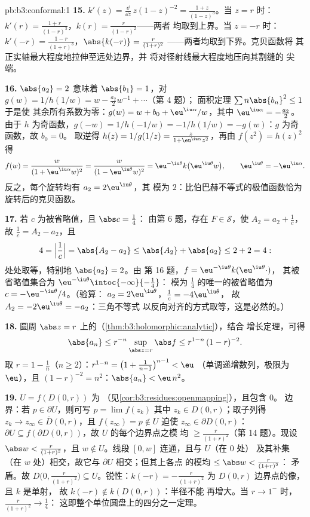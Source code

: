 \begin{solution}{pb:b3:conformal:1}
\textbf{15.} $k'(z) = \frac{\dd}{\dd z}\,z(1 - z)^{-2} =
\frac{1 + z}{(1 - z)^3}$。当 $z = r$ 时：$k'(r) =
\frac{1+r}{(1-r)^3}$，$k(r) = \frac r{(1-r)^2}$——两者
均取到上界。当 $z = -r$ 时：$k'(-r) =
\frac{1-r}{(1+r)^3}$，$\abs{k(-r)} = \frac r{(1+r)^2}$
——两者均取到下界。克贝函数将
其正实轴最大程度地拉伸至远处边界，并
将对径射线最大程度地压向其割缝的
尖端。

\textbf{16.} $\abs{a_2} = 2$ 意味着 $\abs{b_1} = 1$，对 $g(w)
= 1/h(1/w) = w - \frac{a_2}2w^{-1} + \cdots$（第 4 题）；
面积定理 $\sum n\abs{b_n}^2 \leq 1$ 于是使
其余所有系数为零：$g(w) = w + b_0 + \eu^{\iu\alpha}/w$，其中
$\eu^{\iu\alpha} = -\frac{a_2}2$。由于 $h$ 为奇函数，$g(-w) =
1/h(-1/w) = -1/h(1/w) = -g(w)$：$g$ 为奇函数，故 $b_0 = 0$。
取逆得 $h(z) = 1/g(1/z) = \frac{z}{1 +
\eu^{\iu\alpha}z^2}$，再由 $f(z^2) = h(z)^2$ 得
\[
f(w) = \frac{w}{(1 + \eu^{\iu\alpha}w)^2}
= \frac{w}{(1 - \eu^{\iu\theta}w)^2}
= \eu^{-\iu\theta}k\bigl(\eu^{\iu\theta}w\bigr),
\qquad \eu^{\iu\theta} = -\eu^{\iu\alpha} .
\]
反之，每个旋转均有 $a_2 = 2\eu^{\iu\theta}$，其
模为 $2$：比伯巴赫不等式的极值函数恰为
旋转后的克贝函数。

\textbf{17.} 若 $c$ 为被省略值，且 $\abs c = \frac14$：
由第 6 题，存在 $F \in \mathcal S$，使 $A_2 = a_2 +
\frac1c$，故 $\frac1c = A_2 - a_2$，且
\[
4 = \Bigl|\frac1c\Bigr| = \abs{A_2 - a_2}
\leq \abs{A_2} + \abs{a_2} \leq 2 + 2 = 4 :
\]
处处取等，特别地 $\abs{a_2} = 2$。由
第 16 题，$f = \eu^{-\iu\theta}k(\eu^{\iu\theta}\cdot)$，
其被省略值集合为 $\eu^{-\iu\theta}
\intoc{-\infty}{-\frac14}$：
模为 $\frac14$ 的唯一的被省略值为 $c = -\eu^{-\iu\theta}/4$。（验算：
$a_2 = 2\eu^{\iu\theta}$，$\frac1c = -4\eu^{\iu\theta}$，
故 $A_2 = -2\eu^{\iu\theta} = -a_2$：三角不等式
以反向对齐的方式取等，这是必然的。）

\textbf{18.} 圆周 $\abs z =
r$ 上的（\cref{thm:b3:holomorphic:analytic}），结合
增长定理，可得
\[
\abs{a_n} \leq r^{-n}\sup_{\abs z = r}\abs f
\leq r^{1-n}\,(1 - r)^{-2} .
\] 取 $r = 1 - \frac1n$（$n \geq
2$）：$r^{1-n} = \bigl(1 + \frac1{n-1}\bigr)^{n-1} < \eu$
（单调递增数列，极限为 $\eu$），且 $(1 - r)^{-2} =
n^2$：$\abs{a_n} < \eu\,n^2$。

\textbf{19.} $U = f(D(0, r))$ 为
（见\cref{cor:b3:residues:openmapping}），且包含 $0$。
边界：若 $p \in \partial U$，则可写 $p = \lim f(z_k)$
其中 $z_k \in D(0, r)$；取子列得 $z_k \to z_\infty
\in \bar D(0, r)$，且 $f(z_\infty) = p \notin U$ 迫使
$z_\infty \in \partial D(0, r)$：$\partial U \subseteq
f(\partial D(0, r))$，故 $U$ 的每个边界点之模
均 $\geq \frac r{(1+r)^2}$（第 14 题）。现设
$\abs w < \frac r{(1+r)^2}$，且 $w \notin U$。线段
$[0, w]$ 连通，且与 $U$（在 $0$ 处）
及其补集（在 $w$ 处）相交，故它与 $\partial U$ 相交；但其上各点
的模均 $\leq \abs w < \frac r{(1+r)^2}$：
矛盾。故 $D\bigl(0, \frac r{(1+r)^2}\bigr)
\subseteq U$。锐性：$k(-r) = -\frac r{(1+r)^2}$ 为
$D(0,r)$ 边界点的像，且 $k$ 是单射，
故 $k(-r) \notin k(D(0, r))$：半径不能
再增大。当 $r \to 1^-$ 时，$\frac r{(1+r)^2} \to \frac14$：
这即整个单位圆盘上的四分之一定理。


\end{solution}
